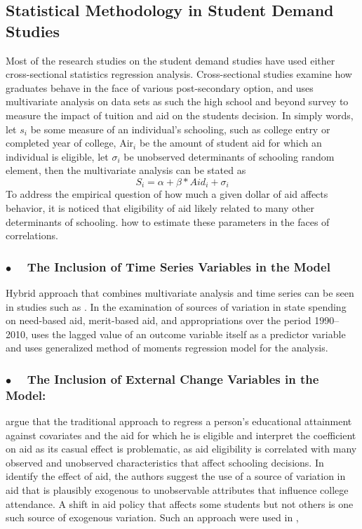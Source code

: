 \documentclass[12pt,english]{report}
\begin{document}
\subsection{Statistical Methodology in Student Demand Studies}
Most of the research studies on the student demand studies have used either
cross-sectional statistics regression analysis.  Cross-sectional studies
examine how graduates behave in the face of various post-secondary option, and
uses multivariate analysis on data sets as such the high school and beyond
survey to measure the impact of tuition and aid on the students decision.    In
simply words, let $s_i$ be some measure of an individual's schooling, such as
college entry or completed year of college, Air$_i$ be the amount of student
aid for which an individual is eligible,  let $\sigma_i$  be unobserved
determinants of schooling  random element, then the multivariate analysis can
be stated as $$S_i = \alpha + \beta * Aid_i + \sigma_i$$
To address the empirical question of how much a given dollar of aid affects
behavior,  it is noticed that eligibility of aid likely related to many other
determinants of schooling.  \cite{Dynarski2002} how to estimate these
parameters in the faces of correlations.

\subsubsection{$\bullet \quad$  The Inclusion of Time Series Variables in the
Model}  Hybrid approach that combines multivariate analysis and time series can
be seen in studies such as \citet{Heller1999}. In the examination of sources of
variation in state spending on need-based aid, merit-based aid, and
appropriations over the period 1990–2010, \citep{McLendon2014} uses the lagged
value of an outcome variable itself as a predictor variable and uses
generalized method of moments regression model for the analysis.

\subsubsection{$\bullet \quad$  The Inclusion of External Change Variables in
the Model:}  \citet{Dynarski2003} argue that the traditional approach to
regress a person's educational attainment against covariates and the aid for
which he is eligible and interpret the coefficient on aid as its casual effect
is problematic, as aid eligibility is correlated with many observed and
unobserved characteristics that affect schooling decisions. In identify the
effect of aid, the authors suggest the use of a source of variation in aid that
is plausibly exogenous to unobservable attributes that influence college
attendance. A shift in aid policy that affects some students but not others is
one such source of exogenous variation.  Such an approach were used in
\citep{Dynarski2003, Abraham2006},
\end{document}
